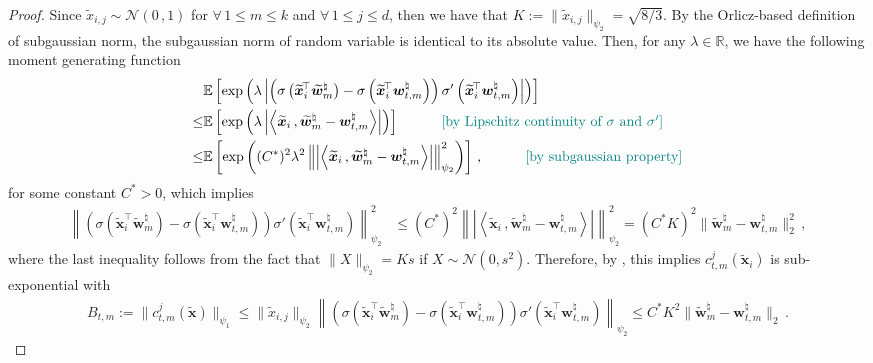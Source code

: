 \begin{proof}
Since $\widetilde{x}_{i,j}\sim \mathcal{N}(0\,,1)$ for $\forall\,1\leq m \leq k$ and $\forall\,1\leq j \leq d$, then we have that $K:=\|\widetilde{x}_{i,j}\|_{\psi_2}=\sqrt{8/3}$. By the Orlicz-based definition of subgaussian norm, the subgaussian norm of random variable is identical to its absolute value. Then, for any $\lambda\in\mathbb{R}$, we have the following moment generating function
\begin{align*}
&\mathbb{E}\left[\operatorname{exp}\left(\lambda\left|\left(\sigma \left(\widetilde{\bm x}_i^{\!\top}\widetilde{\bm w}_m^\natural\right)-\sigma \left(\widetilde{\bm x}_i^{\!\top}{\bm w}_{t,m}^\natural\right)\right)\sigma' \left(\widetilde{\bm x}_i^{\!\top}\bm w_{t,m}^\natural\right)\right| \right)\right]\\
\leq&\mathbb{E}\left[\operatorname{exp}\left(\lambda\left|\left\langle\widetilde{\bm x}_i\,,\widetilde{\bm w}_m^\natural-{\bm w}_{t,m}^\natural\right\rangle\right|\right)\right]\quad \tag*{\color{teal}[by Lipschitz continuity of $\sigma$ and $\sigma'$]}\\
\leq & \mathbb{E}\left[\operatorname{exp}\left((C^*)^2\lambda^2\left\|\left|\left\langle\widetilde{\bm x}_i\,,\widetilde{\bm w}_m^\natural-{\bm w}_{t,m}^\natural\right\rangle\right|\right\|_{\psi_2}^2\right)\right]\,,\quad \tag*{\color{teal}[by subgaussian property]}
\end{align*}
for some constant $C^*>0$, which implies
\begin{align*}
    \left\|\left(\sigma \left(\widetilde{\bm x}_i^{\!\top}\widetilde{\bm w}_m^\natural\right)-\sigma \left(\widetilde{\bm x}_i^{\!\top}{\bm w}_{t,m}^\natural\right)\right)\sigma' \left(\widetilde{\bm x}_i^{\!\top}\bm w_{t,m}^\natural\right)\right\|_{\psi_2}^2 &\leq (C^*)^2\left\|\left|\left\langle\widetilde{\bm x}_i\,,\widetilde{\bm w}_m^\natural-{\bm w}_{t,m}^\natural\right\rangle\right|\right\|_{\psi_2}^2
    = (C^*K)^2 \|\widetilde{\bm w}_m^\natural-{\bm w}_{t,m}^\natural\|_2^2\,,
\end{align*}
where the last inequality follows from the fact that $\|X\|_{\psi_2}=Ks$ if $X\sim\mathcal{N}(0,s^2)$. Therefore, by \citet[Lemma 2.7.7]{vershynin2018high}, this implies $c^j_{t,m}\left(\widetilde{\bm x}_i\right)$ is sub-exponential with
\begin{align}
    B_{t,m}:=\|c^j_{t,m}\left(\widetilde{\bm x}\right)\|_{\psi_1}\leq \|\widetilde{x}_{i,j}\|_{\psi_2}\left\|\left(\sigma \left(\widetilde{\bm x}_i^{\!\top}\widetilde{\bm w}_m^\natural\right)-\sigma \left(\widetilde{\bm x}_i^{\!\top}{\bm w}_{t,m}^\natural\right)\right)\sigma' \left(\widetilde{\bm x}_i^{\!\top}\bm w_{t,m}^\natural\right)\right\|_{\psi_2}\leq C^* K^2 \|\widetilde{\bm w}_m^\natural-{\bm w}_{t,m}^\natural\|_2\,.\label{est-sg-norm}

\end{align}
\end{proof}
